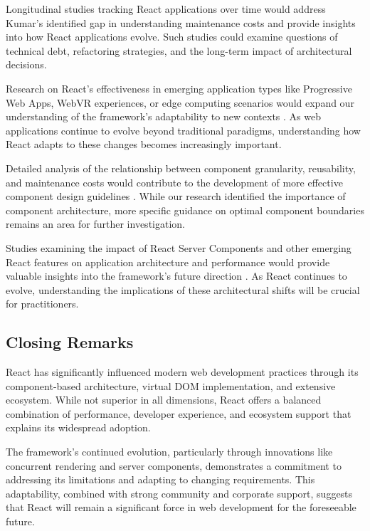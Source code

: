Longitudinal studies tracking React applications over time would address Kumar's identified gap in understanding maintenance costs \cite{kumar2022} and provide insights into how React applications evolve. Such studies could examine questions of technical debt, refactoring strategies, and the long-term impact of architectural decisions.

Research on React's effectiveness in emerging application types like Progressive Web Apps, WebVR experiences, or edge computing scenarios would expand our understanding of the framework's adaptability to new contexts \cite{zhang2022}. As web applications continue to evolve beyond traditional paradigms, understanding how React adapts to these changes becomes increasingly important.

Detailed analysis of the relationship between component granularity, reusability, and maintenance costs would contribute to the development of more effective component design guidelines \cite{williams2020}. While our research identified the importance of component architecture, more specific guidance on optimal component boundaries remains an area for further investigation.

Studies examining the impact of React Server Components and other emerging React features on application architecture and performance would provide valuable insights into the framework's future direction \cite{wilson2022}. As React continues to evolve, understanding the implications of these architectural shifts will be crucial for practitioners.

\subsection{Closing Remarks}
React has significantly influenced modern web development practices through its component-based architecture, virtual DOM implementation, and extensive ecosystem. While not superior in all dimensions, React offers a balanced combination of performance, developer experience, and ecosystem support that explains its widespread adoption.

The framework's continued evolution, particularly through innovations like concurrent rendering and server components, demonstrates a commitment to addressing its limitations and adapting to changing requirements. This adaptability, combined with strong community and corporate support, suggests that React will remain a significant force in web development for the foreseeable future.

